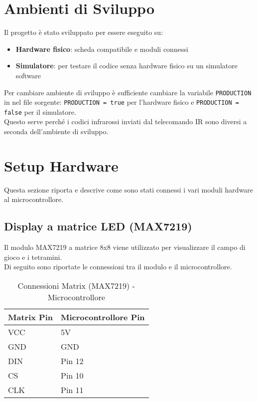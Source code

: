\documentclass[a4paper, 12pt]{article}
\begin{document}
\section{Ambienti di Sviluppo}
Il progetto è stato sviluppato per essere eseguito su:
\begin{itemize}
    \item \textbf{Hardware fisico}: scheda compatibile e moduli connessi
    \item \textbf{Simulatore}: per testare il codice senza hardware fisico su un simulatore software
\end{itemize}
Per cambiare ambiente di sviluppo è sufficiente cambiare la variabile \texttt{PRODUCTION} in nel file sorgente: \texttt{PRODUCTION = true} per l'hardware fisico e \texttt{PRODUCTION = false} per il simulatore.\\
Questo serve perché i codici infrarossi inviati dal telecomando IR sono diversi a seconda dell'ambiente di sviluppo.\\

\section{Setup Hardware}
Questa sezione riporta e descrive come sono stati connessi i vari moduli hardware al microcontrollore.

\subsection{Display a matrice LED (MAX7219)}
Il modulo MAX7219 a matrice 8x8 viene utilizzato per visualizzare il campo di gioco e i tetramini.\\
Di seguito sono riportate le connessioni tra il modulo e il microcontrollore.
\begin{table}[H]
  \centering
  \caption{Connessioni Matrix (MAX7219) - Microcontrollore}
  \label{tab:matrix-max7219-connections}
  \begin{tabular}{ll}
    \toprule
    \textbf{Matrix Pin} & \textbf{Microcontrollore Pin} \\
    \midrule
    VCC  & 5V       \\
    GND  & GND      \\
    DIN  & Pin 12   \\
    CS   & Pin 10   \\
    CLK  & Pin 11   \\
    \bottomrule
  \end{tabular}
\end{table}
\end{document}
